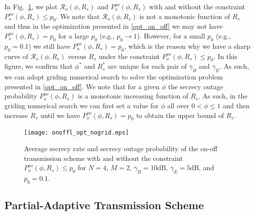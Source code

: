 \documentclass[journal]{IEEEtran}
\begin{document}
In Fig.~\ref{fig:opt_onoff}, we plot $\mathcal{R}_o (\phi, R_s)$ and $P^{so}_o(\phi, R_s)$ with and without the constraint $P^{so}_o(\phi, R_s) \leq p_0$. We note that $\mathcal{R}_o (\phi, R_s)$ is not a monotonic function of $R_s$ and thus in the optimization presented in \eqref{opt_on_off} we may not have $P^{so}_o(\phi, R_s) = p_0$ for a large $p_0$ (e.g., $p_0 \rightarrow 1$). However, for a small $p_0$ (e.g., $p_0 = 0.1$) we still have $P^{so}_o(\phi, R_s) = p_0$, which is the reason why we have a sharp curve of $\mathcal{R}_o (\phi, R_s)$ versus $R_s$ under the constraint $P^{so}_o(\phi, R_s) \leq p_0$. In this figure, we confirm that $\phi^{\ast}$ and $R_s^{\ast}$ are unique for each pair of $\overline{\gamma}_B$ and $\overline{\gamma}_E$. As such, we can adopt griding numerical search to solve the optimization problem presented in \eqref{opt_on_off}.
We note that for a given $\phi$ the secrecy outage probability $P^{so}_o(\phi, R_s)$ is a monotonic increasing function of $R_s$. As such, in the griding numerical search we can first set a value for $\phi$ all over $0< \phi \leq 1$ and then increase $R_s$ until we have $P^{so}_o(\phi, R_s) = p_0$ to obtain the upper bound of $R_s$.

\begin{figure}[!t]
    \begin{center}
   {\texttt{[image: onoffl\_opt\_nogrid.eps]}}
    \caption{Average secrecy rate and secrecy outage probability of the on-off transmission scheme with and without the constraint $P^{so}_o(\phi, R_s) \leq p_0$ for $N = 4$, $M =2$, $\overline{\gamma}_B = 10$dB, $\overline{\gamma}_E = 5$dB, and $p_0 = 0.1$. }\label{fig:opt_onoff}
    \end{center}
\end{figure}



\subsection{Partial-Adaptive Transmission Scheme}
\end{document}

